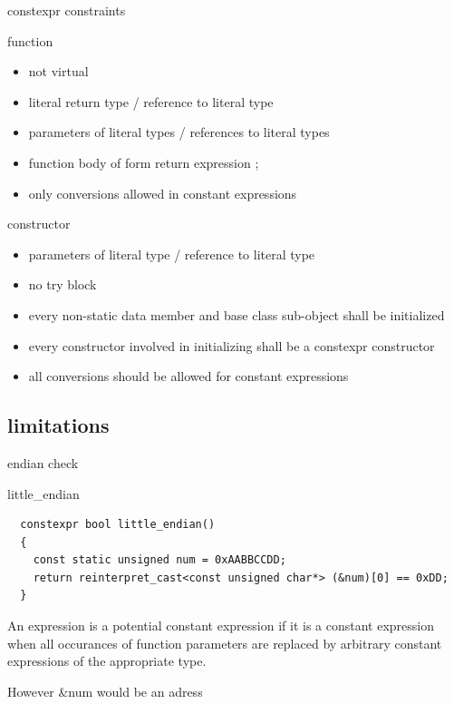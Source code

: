 \documentclass{beamer}
\begin{document}
\begin{frame}{constexpr constraints}
  \begin{block}{function}
    \begin{itemize}
    \item not virtual
    \item literal return type / reference to literal type
    \item parameters of literal types / references to literal types
    \item function body of form { return expression ; }
    \item only conversions allowed in constant expressions
    \end{itemize}
  \end{block}

  \begin{block}{constructor}
    \begin{itemize}
    \item parameters of literal type / reference to literal type
    \item no try block
    \item every non-static data member and base class sub-object shall be initialized
    \item every constructor involved in initializing shall be a constexpr constructor
    \item all conversions should be allowed for constant expressions
    \end{itemize}
  \end{block}
\end{frame}

\subsection{limitations}
\begin{frame}{endian check}
  \begin{block}{little\_endian}
\begin{verbatim}
  constexpr bool little_endian()
  {
    const static unsigned num = 0xAABBCCDD;
    return reinterpret_cast<const unsigned char*> (&num)[0] == 0xDD;
  }
\end{verbatim}
An expression is a potential constant expression if it is a constant
expression when all occurances of function parameters are replaced by
arbitrary constant expressions of the appropriate type.

However &num would be an adress
  \end{block}
\end{frame}
\end{document}
